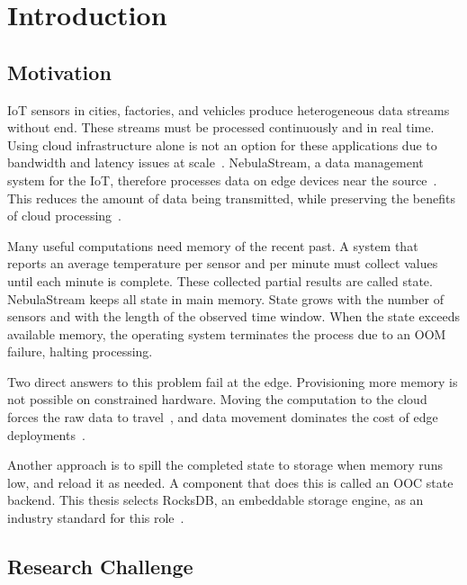 \chapter{Introduction\label{cha:introduction}}

\section{Motivation\label{sec:motivation}}

\ac{IoT} sensors in cities, factories, and vehicles produce heterogeneous data streams without end.
These streams must be processed continuously and in real time.
Using cloud infrastructure alone is not an option for these applications due to bandwidth and latency issues at scale~\cite{zeuch2020}.
NebulaStream, a data management system for the \ac{IoT}, therefore processes data on edge devices near the source~\cite{zeuch2020,zeuch2022}.
This reduces the amount of data being transmitted, while preserving the benefits of cloud processing~\cite{zeuch2020,zeuch2022}.

Many useful computations need memory of the recent past.
A system that reports an average temperature per sensor and per minute must collect values until each minute is complete.
These collected partial results are called state.
NebulaStream keeps all state in main memory.
State grows with the number of sensors and with the length of the observed time window.
When the state exceeds available memory, the operating system terminates the process due to an \ac{OOM} failure, halting processing.

Two direct answers to this problem fail at the edge.
Provisioning more memory is not possible on constrained hardware.
Moving the computation to the cloud forces the raw data to travel~\cite{zeuch2020}, and data movement dominates the cost of edge deployments~\cite{horowitz2014}.

Another approach is to spill the completed state to storage when memory runs low, and reload it as needed.
A component that does this is called an \ac{OOC} state backend.
This thesis selects RocksDB, an embeddable storage engine, as an industry standard for this role~\cite{flink2021,dong2021}.

\section{Research Challenge\label{sec:challenge}}

